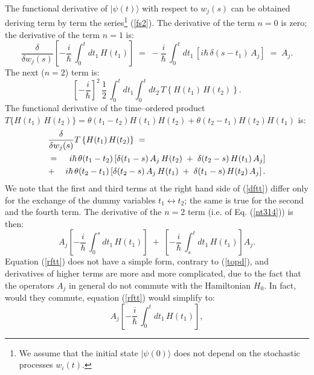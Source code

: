 \documentclass[12pt]{article}
\begin{document}
The functional derivative of $|\psi(t)\rangle$ with respect to
$w_{j}(s)$ can be obtained deriving  term by term the
series\footnote{We assume that the initial state $|\psi(0)\rangle$
does not depend on the stochastic processes $w_{i}(t)$.}
(\ref{fs2}). The derivative of the term $n=0$ is zero; the
derivative of the term $n=1$ is:
\begin{equation} \label{topd}
\frac{\delta}{\delta w_{j}(s)} \left[ -\frac{i}{\hbar}\,
\int_{0}^{t} dt_{1}\, H(t_{1}) \right] \; = \; -\frac{i}{\hbar}\,
\int_{0}^{t} dt_{1}\, \left[ i\hbar\, \delta(s - t_{1})\, A_{j}
\right] \; = \; A_{j}.
\end{equation}
The next ($n=2$) term is:
\begin{equation} \label{nt314}
\left[-\frac{i}{\hbar}\right]^{2}\, \frac{1}{2}\, \int_{0}^{t}
dt_{1} \int_{0}^{t} dt_{2}\, T\left\{H(t_{1}) \, H(t_{2})
\right\}.
\end{equation}
The functional derivative of the time--ordered product $T \{
H(t_{1})\, H(t_{2}) \} = \theta(t_{1}-t_{2})H(t_{1})H(t_{2}) +
\theta(t_{2} - t_{1}) H(t_{2}) H(t_{1})$ is:
\begin{eqnarray} \label{dftt}
\lefteqn{\frac{\delta}{\delta w_{j}(s)} T\left\{ H(t_{1}) \,
H(t_{2}) \right\} \; = \qquad\quad} \nonumber \\
& = & i\hbar\,\theta(t_{1}-t_{2})\left[ \delta(t_{1} - s)\,
A_{j}\, H(t_{2}) \; + \; \delta(t_{2} - s)\, H(t_{1})\, A_{j}
\right] \nonumber \\
& + & i\hbar\,\theta(t_{2}-t_{1})\left[ \delta(t_{2} - s)\,
A_{j}\, H(t_{1}) \; + \; \delta(t_{1} - s)\, H(t_{2})\, A_{j}
\right].
\end{eqnarray}
We note that the first and third terms at the right hand side of
(\ref{dftt}) differ only for the exchange of the dummy variables
$t_{1} \leftrightarrow t_{2}$; the same is true for the second and
the fourth term. The derivative of the $n=2$ term (i.e. of Eq.
(\ref{nt314}))  is then:
\begin{equation} \label{rftt}
A_{j} \left[ -\frac{i}{\hbar}\, \int_{0}^{s} dt_{1}\, H(t_{1})
\right] \; + \; \left[ -\frac{i}{\hbar}\, \int_{s}^{t} dt_{1}\,
H(t_{1}) \right] A_{j}.
\end{equation}
Equation (\ref{rftt}) does not have a simple form, contrary to
(\ref{topd}), and derivatives of higher terms are more and more
complicated, due to the fact that the operators $A_{j}$ in general
do not commute with the Hamiltonian $H_{0}$. In fact, would they
commute, equation (\ref{rftt}) would simplify to:
\begin{equation}
A_{j} \left[ -\frac{i}{\hbar}\, \int_{0}^{t} dt_{1}\, H(t_{1})
\right],
\end{equation}
\end{document}
